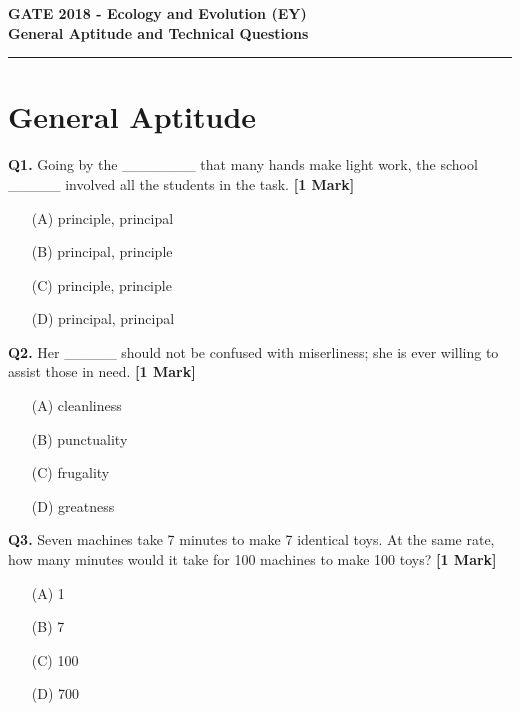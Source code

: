 \documentclass[11pt]{article}
\newcommand{\questiona}[2]{
    \noindent\textbf{Q#2.} #1 \hfill \textbf{[1 Mark]}
}
\begin{document}
\begin{center}
    \Large\textbf{GATE 2018 - Ecology and Evolution (EY)} \\
    \large\textbf{General Aptitude and Technical Questions} \\
    \rule{\textwidth}{0.5pt} %
\end{center}

\vspace{0.5cm}

\section*{General Aptitude}

\questiona{Going by the \_\_\_\_\_\_\_ that many hands make light work, the school \_\_\_\_\_ involved all the students in the task.}{1}
\begin{enumerate}
    \item[(A)] principle, principal
    \item[(B)] principal, principle
    \item[(C)] principle, principle
    \item[(D)] principal, principal
\end{enumerate}
\vspace{0.5cm}

\questiona{Her \_\_\_\_\_ should not be confused with miserliness; she is ever willing to assist those in need.}{2}
\begin{enumerate}
    \item[(A)] cleanliness
    \item[(B)] punctuality
    \item[(C)] frugality
    \item[(D)] greatness
\end{enumerate}
\vspace{0.5cm}

\questiona{Seven machines take 7 minutes to make 7 identical toys. At the same rate, how many minutes would it take for 100 machines to make 100 toys?}{3}
\begin{enumerate}
    \item[(A)] 1
    \item[(B)] 7
    \item[(C)] 100
    \item[(D)] 700
\end{enumerate}
\vspace{0.5cm}
\end{document}
